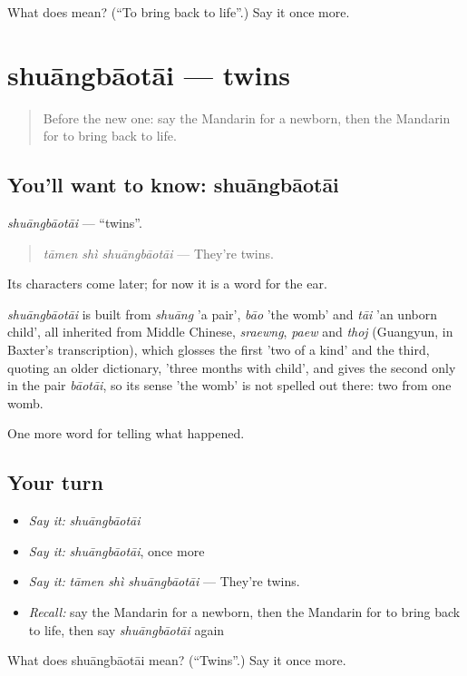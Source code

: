 \begin{tcolorbox}[breakable,colback=teal!4,colframe=teal!35!black,title={Before you move on}]
What does  mean? (\textquotedblleft{}To bring back to life\textquotedblright{}.) Say it once more.
\end{tcolorbox}
\section[shuāngbāotāi]{shuāngbāotāi — twins}

\label{lesson:ZH-C302-shuangbaotai}



\begin{quote}
Before the new one: say the Mandarin for a newborn, then the Mandarin for to bring back to life.
\end{quote}

\subsection*{You'll want to know: shuāngbāotāi}
\emph{shuāngbāotāi} — \textquotedblleft{}twins\textquotedblright{}.

\begin{quote}
\emph{tāmen shì shuāngbāotāi} — They're twins.
\end{quote}

Its characters come later; for now it is a word for the ear.

\begin{cousinweb}
\emph{shuāngbāotāi} is built from \emph{shuāng} 'a pair', \emph{bāo} 'the womb' and \emph{tāi} 'an unborn child', all inherited from Middle Chinese, \emph{sraewng}, \emph{paew} and \emph{thoj} (Guangyun, in Baxter's transcription), which glosses the first 'two of a kind' and the third, quoting an older dictionary, 'three months with child', and gives the second only in the pair \emph{bāotāi}, so its sense 'the womb' is not spelled out there: two from one womb.
\end{cousinweb}

\begin{grammarlens}[title={What you've built}]
One more word for telling what happened.
\end{grammarlens}

\subsection*{Your turn}
\begin{itemize}
\raggedright
  \item \emph{Say it:} \emph{shuāngbāotāi}
  \item \emph{Say it:} \emph{shuāngbāotāi}, once more
  \item \emph{Say it:} \emph{tāmen shì shuāngbāotāi} — They're twins.
  \item \emph{Recall:} say the Mandarin for a newborn, then the Mandarin for to bring back to life, then say \emph{shuāngbāotāi} again
\end{itemize}

\begin{tcolorbox}[breakable,colback=teal!4,colframe=teal!35!black,title={Before you move on}]
What does shuāngbāotāi mean? (\textquotedblleft{}Twins\textquotedblright{}.) Say it once more.
\end{tcolorbox}
